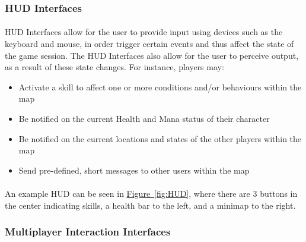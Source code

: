 \documentclass[12pt, titlepage]{article}
\begin{document}
\subsubsection{HUD Interfaces}
\paragraph{}HUD Interfaces allow for the user to provide input using devices such as the keyboard and mouse, in order trigger certain events and thus affect the state of the game session. The HUD Interfaces also allow for the user to perceive output, as a result of these state changes. For instance, players may:
\begin{itemize}
    \item Activate a skill to affect one or more conditions and/or behaviours within the map
    \item Be notified on the current Health and Mana status of their character
    \item Be notified on the current locations and states of the other players within the map
    \item Send pre-defined, short messages to other users within the map
\end{itemize}
\paragraph{}An example HUD can be seen in \hyperref[fig:HUD]{Figure~\ref*{fig:HUD}}, where there are 3 buttons in the center indicating skills, a health bar to the left, and a minimap to the right.

\subsubsection{Multiplayer Interaction Interfaces}
\end{document}
